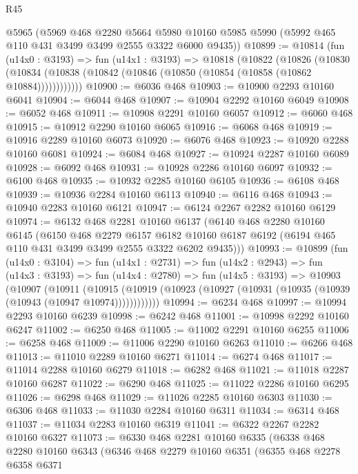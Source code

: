 \begin{lexlean}{R45}
\begin{coremodule}
    @5965
    (@5969
      @468
      @2280
      @5664
      @5980
      @10160
      @5985
      @5990
      (@5992 @465 @110 @431 @3499 @3499 @2555 @3322 @6000 @9435))
@10899 := @10814
    (fun (u14x0 : @3193) =>
    fun (u14x1 : @3193) =>
    @10818
      (@10822
        (@10826
          (@10830 (@10834 (@10838 (@10842 (@10846 (@10850 (@10854 (@10858 (@10862 @10884))))))))))))
@10900 := @6036 @468
@10903 := @10900 @2293 @10160 @6041
@10904 := @6044 @468
@10907 := @10904 @2292 @10160 @6049
@10908 := @6052 @468
@10911 := @10908 @2291 @10160 @6057
@10912 := @6060 @468
@10915 := @10912 @2290 @10160 @6065
@10916 := @6068 @468
@10919 := @10916 @2289 @10160 @6073
@10920 := @6076 @468
@10923 := @10920 @2288 @10160 @6081
@10924 := @6084 @468
@10927 := @10924 @2287 @10160 @6089
@10928 := @6092 @468
@10931 := @10928 @2286 @10160 @6097
@10932 := @6100 @468
@10935 := @10932 @2285 @10160 @6105
@10936 := @6108 @468
@10939 := @10936 @2284 @10160 @6113
@10940 := @6116 @468
@10943 := @10940 @2283 @10160 @6121
@10947 := @6124 @2267 @2282 @10160 @6129
@10974 := @6132
    @468
    @2281
    @10160
    @6137
    (@6140
      @468
      @2280
      @10160
      @6145
      (@6150
        @468
        @2279
        @6157
        @6182
        @10160
        @6187
        @6192
        (@6194 @465 @110 @431 @3499 @3499 @2555 @3322 @6202 @9435)))
@10993 := @10899
    (fun (u14x0 : @3104) =>
    fun (u14x1 : @2731) =>
    fun (u14x2 : @2943) =>
    fun (u14x3 : @3193) =>
    fun (u14x4 : @2780) =>
    fun (u14x5 : @3193) =>
    @10903
      (@10907
        (@10911
          (@10915 (@10919 (@10923 (@10927 (@10931 (@10935 (@10939 (@10943 (@10947 @10974))))))))))))
@10994 := @6234 @468
@10997 := @10994 @2293 @10160 @6239
@10998 := @6242 @468
@11001 := @10998 @2292 @10160 @6247
@11002 := @6250 @468
@11005 := @11002 @2291 @10160 @6255
@11006 := @6258 @468
@11009 := @11006 @2290 @10160 @6263
@11010 := @6266 @468
@11013 := @11010 @2289 @10160 @6271
@11014 := @6274 @468
@11017 := @11014 @2288 @10160 @6279
@11018 := @6282 @468
@11021 := @11018 @2287 @10160 @6287
@11022 := @6290 @468
@11025 := @11022 @2286 @10160 @6295
@11026 := @6298 @468
@11029 := @11026 @2285 @10160 @6303
@11030 := @6306 @468
@11033 := @11030 @2284 @10160 @6311
@11034 := @6314 @468
@11037 := @11034 @2283 @10160 @6319
@11041 := @6322 @2267 @2282 @10160 @6327
@11073 := @6330
    @468
    @2281
    @10160
    @6335
    (@6338
      @468
      @2280
      @10160
      @6343
      (@6346
        @468
        @2279
        @10160
        @6351
        (@6355
          @468
          @2278
          @6358
          @6371

\end{coremodule}
\end{lexlean}
